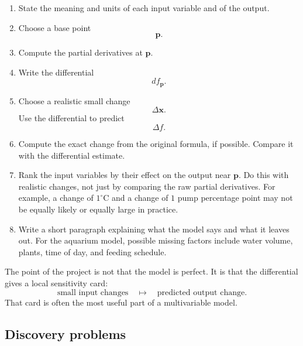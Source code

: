 \begin{enumerate}
\item State the meaning and units of each input variable and of the output.

\item Choose a base point
\[
    \mathbf p.
\]

\item Compute the partial derivatives at \(\mathbf p\).

\item Write the differential
\[
    df_{\mathbf p}.
\]

\item Choose a realistic small change
\[
    \Delta\mathbf x.
\]
Use the differential to predict
\[
    \Delta f.
\]

\item Compute the exact change from the original formula, if possible.  Compare it
with the differential estimate.

\item Rank the input variables by their effect on the output near \(\mathbf p\).  Do this
with realistic changes, not just by comparing the raw partial derivatives.  For example,
a change of \(1^\circ\)C and a change of \(1\) pump percentage point may not be equally
likely or equally large in practice.

\item Write a short paragraph explaining what the model says and what it leaves out.
For the aquarium model, possible missing factors include water volume, plants, time of
day, and feeding schedule.
\end{enumerate}

The point of the project is not that the model is perfect.  It is that the differential gives
a local sensitivity card:
\[
    \text{small input changes}
    \quad\longmapsto\quad
    \text{predicted output change}.
\]
That card is often the most useful part of a multivariable model.

\subsection*{Discovery problems}


